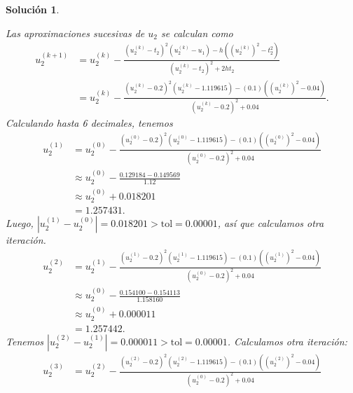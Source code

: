 \documentclass[11pt,letterpaper]{article}
\newtheorem*{sol}{Solución}
\newcommand\tol{\mathrm{tol}}
\begin{document}
\begin{sol}
\begin{enumerate}
      Las aproximaciones sucesivas de $u_2$ 
      se calculan como
      \begin{align}
        u_2^{(k+1)}
        &=
          u_{2}^{(k)}
          - \frac
          {
            (u_2^{(k)}-t_2)^{2}(u_{2}^{(k)} - u_{1})
            - h ((u_2^{(k)})^{2}-t_2^{2})
          }
          {
            (u_2^{(k)}-t_2)^{2} + 2ht_2
          }
          \\
        &=
          u_{2}^{(k)}
          - \frac
          {
            (u_2^{(k)}-0.2)^{2}(u_{2}^{(k)} - 1.119615)
            - (0.1)((u_2^{(k)})^{2}-0.04)
          }
          {
            (u_2^{(k)}-0.2)^{2} + 0.04
          }
      .\end{align}
      Calculando hasta 6 decimales, tenemos
      \begin{align}
        u_2^{(1)}
        &=
          u_{2}^{(0)}
          - \frac
          {
            (u_2^{(0)}-0.2)^{2}(u_{2}^{(0)} - 1.119615)
            - (0.1)((u_2^{(0)})^{2}-0.04)
          }
          {
            (u_2^{(0)}-0.2)^{2} + 0.04
          }
          \\
        &\approx
          u_{2}^{(0)} - \frac { 0.129184 - 0.149569} { 1.12 } \\
        &\approx u_{2}^{(0)} + 0.018201 \\
        &= 1.257431
      .\end{align}
      Luego, $|u_2^{(1)}-u_2^{(0)}|=0.018201>\tol=0.00001$, así que
      calculamos otra iteración.
      \begin{align}
        u_2^{(2)}
        &=
          u_{2}^{(1)}
          - \frac
          {
            (u_2^{(1)}-0.2)^{2}(u_{2}^{(1)} - 1.119615)
            - (0.1)((u_2^{(1)})^{2}-0.04)
          }
          {
            (u_2^{(0)}-0.2)^{2} + 0.04
          }
          \\
        &\approx
          u_{2}^{(0)} - \frac { 0.154100 - 0.154113 } { 1.158160 } \\
        &\approx u_{2}^{(0)} + 0.000011 \\
        &= 1.257442
      .\end{align}
      Tenemos $|u_2^{(2)}-u_2^{(1)}|=0.000011>\tol=0.00001$.
      Calculamos otra iteración:
      \begin{align}
        u_2^{(3)}
        &=
          u_{2}^{(2)}
          - \frac
          {
            (u_2^{(2)}-0.2)^{2}(u_{2}^{(2)} - 1.119615)
            - (0.1)((u_2^{(2)})^{2}-0.04)
          }
          {
            (u_2^{(0)}-0.2)^{2} + 0.04
          }
          \\

\end{align}
\end{enumerate}
\end{sol}
\end{document}
